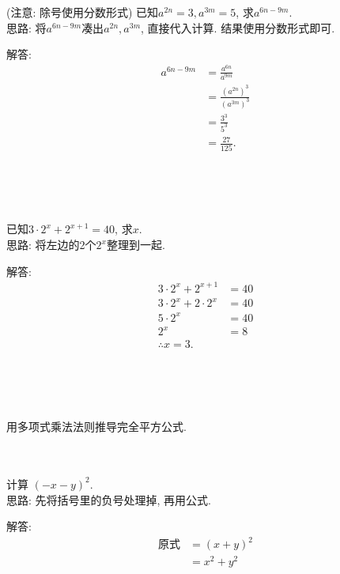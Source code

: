 \item{
    (注意: 除号使用分数形式) 已知$a^{2n}=3, a^{3m}=5$, 求$a^{6n-9m}$.
    \ifshowSolution
    \fangsong{}
    \\
    思路: 将$a^{6n-9m}$凑出$a^{2n}, a^{3m}$, 直接代入计算. 结果使用分数形式即可.

    解答: 
    \begin{align*}
        a^{6n-9m} &= \frac{a^{6n}}{a^{9m}}\\
        &= \frac{(a^{2n})^3} {(a^{3m})^3}\\
        &= \frac{3^3} {5^3}\\
        &= \frac{27} {125}.
    \end{align*}
    \fi
}
\\ \\ \\

\item{
    已知$3\cdot2^x + 2^{x+1}=40$, 求$x$.
    \ifshowSolution
    \fangsong{}
    \\
    思路: 将左边的2个$2^{x}$整理到一起.

    解答: 
    \begin{align*}
        3\cdot2^x + 2^{x+1} &= 40\\
        3\cdot2^x + 2\cdot 2^{x} &= 40\\
        5\cdot2^x &= 40\\
        2^x &= 8\\
        \therefore x = 3.
    \end{align*}
    \fi
}
\\ \\ \\

\item{
    用多项式乘法法则推导完全平方公式.
}
\\ \\ \\

\item{
    计算 $(-x-y)^2$.
    \ifshowSolution
    \fangsong{}
    \\
    思路: 先将括号里的负号处理掉, 再用公式.

    解答: 
    \begin{align*}
        \mbox{原式} &= (x+y)^2\\
        &= x^2 + y^2
    \end{align*}
    \fi
}
\\ \\ \\

